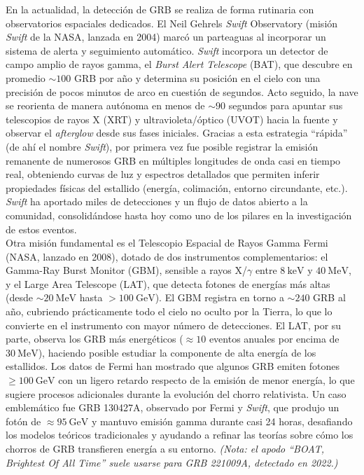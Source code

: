 \documentclass[final,5p,times,twocolumn,authoryear]{elsarticle}
\begin{document}
En la actualidad, la detección de GRB se realiza de forma rutinaria con observatorios espaciales dedicados. El Neil Gehrels \textit{Swift} Observatory (misión \textit{Swift} de la NASA, lanzada en 2004) marcó un parteaguas al incorporar un sistema de alerta y seguimiento automático. \textit{Swift} incorpora un detector de campo amplio de rayos gamma, el \textit{Burst Alert Telescope} (BAT), que descubre en promedio \(\sim 100\) GRB por año y determina su posición en el cielo con una precisión de pocos minutos de arco en cuestión de segundos. \citep{NASA_Swift_About} Acto seguido, la nave se reorienta de manera autónoma en menos de \(\sim 90\) segundos para apuntar sus telescopios de rayos X (XRT) y ultravioleta/óptico (UVOT) hacia la fuente y observar el \textit{afterglow} desde sus fases iniciales. \citep{NASA_Swift_About} Gracias a esta estrategia ``rápida'' (de ahí el nombre \textit{Swift}), por primera vez fue posible registrar la emisión remanente de numerosos GRB en múltiples longitudes de onda casi en tiempo real, obteniendo curvas de luz y espectros detallados que permiten inferir propiedades físicas del estallido (energía, colimación, entorno circundante, etc.). \textit{Swift} ha aportado miles de detecciones y un flujo de datos abierto a la comunidad, consolidándose hasta hoy como uno de los pilares en la investigación de estos eventos.\\

Otra misión fundamental es el Telescopio Espacial de Rayos Gamma Fermi (NASA, lanzado en 2008), dotado de dos instrumentos complementarios: el Gamma-Ray Burst Monitor (GBM), sensible a rayos X/\(\gamma\) entre \(8~\mathrm{keV}\) y \(40~\mathrm{MeV}\), y el Large Area Telescope (LAT), que detecta fotones de energías más altas (desde \(\sim 20~\mathrm{MeV}\) hasta \(>100~\mathrm{GeV}\)). El GBM registra en torno a \(\sim 240\) GRB al año, cubriendo prácticamente todo el cielo no oculto por la Tierra, lo que lo convierte en el instrumento con mayor número de detecciones. El LAT, por su parte, observa los GRB más energéticos (\(\approx 10\) eventos anuales por encima de \(30~\mathrm{MeV}\)), haciendo posible estudiar la componente de alta energía de los estallidos. Los datos de Fermi han mostrado que algunos GRB emiten fotones \(\geq 100~\mathrm{GeV}\) con un ligero retardo respecto de la emisión de menor energía, lo que sugiere procesos adicionales durante la evolución del chorro relativista. Un caso emblemático fue GRB 130427A, observado por Fermi y \textit{Swift}, que produjo un fotón de \(\approx 95~\mathrm{GeV}\) y mantuvo emisión gamma durante casi 24 horas, desafiando los modelos teóricos tradicionales y ayudando a refinar las teorías sobre cómo los chorros de GRB transfieren energía a su entorno. \emph{(Nota: el apodo “BOAT, Brightest Of All Time” suele usarse para GRB 221009A, detectado en 2022.)}\\
\end{document}
